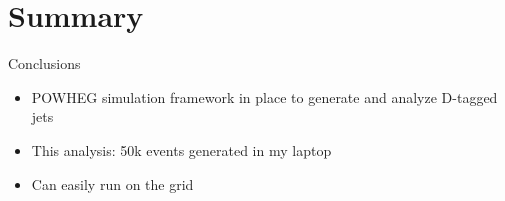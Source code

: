\documentclass[xcolor={usenames,dvipsnames}]{beamer}
\begin{document}
\section*{Summary}

\begin{frame}{Conclusions}
\begin{itemize}
\item POWHEG simulation framework in place to generate and analyze D-tagged jets
\item This analysis: 50k events generated in my laptop
\item Can easily run on the grid
\end{itemize}
\end{frame}
\end{document}
